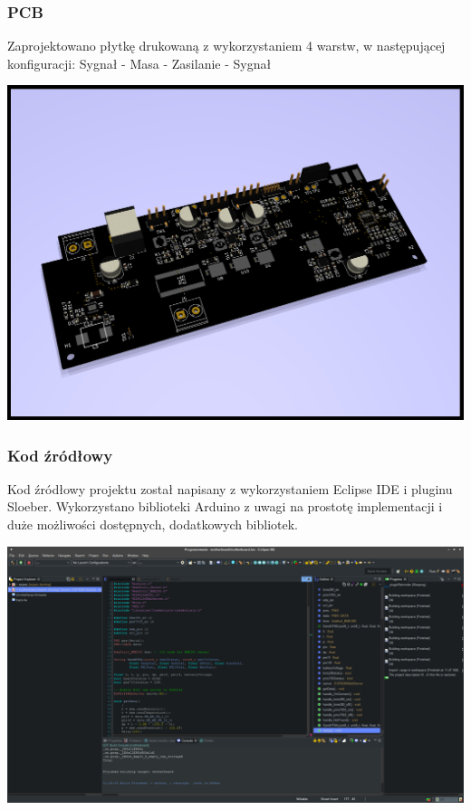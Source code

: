 \documentclass{beamer}
\begin{document}
\begin{frame}
	\frametitle{PCB}
	Zaprojektowano płytkę drukowaną z wykorzystaniem 4 warstw, w następującej konfiguracji: Sygnał - Masa - Zasilanie - Sygnał
	\begin{center}
		\includegraphics[scale=0.15]{img/render.png}
	\end{center}
\end{frame}
\begin{frame}
\frametitle{Kod źródłowy}
	Kod źródłowy projektu został napisany z wykorzystaniem Eclipse IDE i pluginu Sloeber. Wykorzystano biblioteki Arduino z uwagi na prostotę implementacji i duże możliwości dostępnych, dodatkowych bibliotek.
		\begin{center}
		\includegraphics[scale=0.1]{img/eclipse.png}
	\end{center}
\end{frame}
\end{document}

